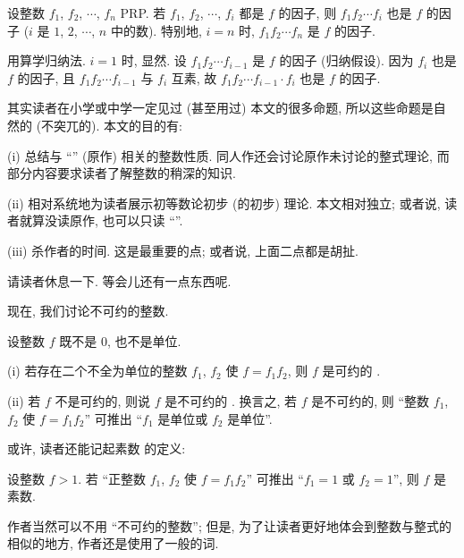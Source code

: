 \begin{proposition}
    设整数 $f_1$, $f_2$, $\cdots$, $f_n$ PRP. 若 $f_1$, $f_2$, $\cdots$, $f_i$ 都是 $f$ 的因子, 则 $f_1 f_2 \cdots f_i$ 也是 $f$ 的因子 ($i$ 是 $1$, $2$, $\cdots$, $n$ 中的数). 特别地, $i = n$ 时, $f_1 f_2 \cdots f_n$ 是 $f$ 的因子.
\end{proposition}

\begin{pf}
    用算学归纳法. $i = 1$ 时, 显然. 设 $f_1 f_2 \cdots f_{i-1}$ 是 $f$ 的因子 (归纳假设). 因为 $f_i$ 也是 $f$ 的因子, 且 $f_1 f_2 \cdots f_{i-1}$ 与 $f_i$ 互素, 故 $f_1 f_2 \cdots f_{i-1} \cdot f_i$ 也是 $f$ 的因子.
\end{pf}

\begin{remark}
    其实读者在小学或中学一定见过 (甚至用过) 本文的很多命题, 所以这些命题是自然的 (不突兀的). 本文的目的有:

    (i) 总结与 ``\HEADING'' (原作) 相关的整数性质. 同人作还会讨论原作未讨论的整式理论, 而部分内容要求读者了解整数的稍深的知识.

    (ii) 相对系统地为读者展示初等数论初步 (的初步) 理论. 本文相对独立; 或者说, 读者就算没读原作, 也可以只读 ``\SomePropertiesOfIntegers''.

    (iii) 杀作者的时间. 这是最重要的点; 或者说, 上面二点都是胡扯.

    请读者休息一下. 等会儿还有一点东西呢.
\end{remark}

\myLine

现在, 我们讨论不可约的整数.

\begin{definition}
    设整数 $f$ 既不是 $0$, 也不是单位.

    (i) 若存在二个不全为单位的整数 $f_1$, $f_2$ 使 $f = f_1 f_2$, 则 $f$ 是可约的 .

    (ii) 若 $f$ 不是可约的, 则说 $f$ 是不可约的 . 换言之, 若 $f$ 是不可约的, 则 ``整数 $f_1$, $f_2$ 使 $f = f_1 f_2$'' 可推出 ``$f_1$ 是单位或 $f_2$ 是单位''.
\end{definition}

\begin{remark}
    或许, 读者还能记起素数  的定义:

    设整数 $f > 1$. 若 ``正整数 $f_1$, $f_2$ 使 $f = f_1 f_2$'' 可推出 ``$f_1 = 1$ 或 $f_2 = 1$'', 则 $f$ 是素数.

    作者当然可以不用 ``不可约的整数''; 但是, 为了让读者更好地体会到整数与整式的相似的地方, 作者还是使用了一般的词.
\end{remark}


